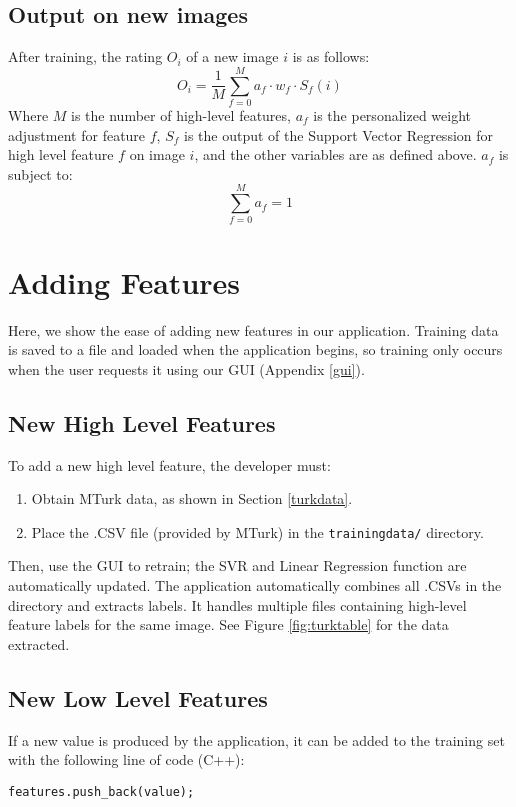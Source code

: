 \documentclass[11pt,letter]{article}
\begin{document}
\subsection{Output on new images}
After training, the rating $O_i$ of a new image $i$ is as follows:
\[
O_i=\frac{1}{M}\displaystyle\sum\limits_{f=0}^Ma_f \cdot w_f \cdot S_f(i)
\]
Where $M$ is the number of high-level features, $a_f$ is the personalized weight adjustment for feature $f$, $S_f$ is the output of the Support Vector Regression for high level feature $f$ on image $i$, and the other variables are as defined above. $a_f$ is subject to:
\[
\displaystyle\sum\limits_{f=0}^M a_f = 1
\]


\section{Adding Features}
Here, we show the ease of adding new features in our application. Training data is saved to a file and loaded when the application begins, so training only occurs when the user requests it using our GUI (Appendix \ref{gui}).

\subsection{New High Level Features}
To add a new high level feature, the developer must:

\begin{enumerate}
\item Obtain MTurk data, as shown in Section \ref{turkdata}.
\item Place the .CSV file (provided by MTurk) in the \texttt{trainingdata/} directory.
\end{enumerate}

Then, use the GUI to retrain; the SVR and Linear Regression function are automatically updated. The application automatically combines all .CSVs in the directory and extracts labels. It handles multiple files containing high-level feature labels for the same image. See Figure \ref{fig:turktable} for the data extracted.

\subsection{New Low Level Features}
If a new value is produced by the application, it can be added to the training set with the following line of code (C++):

\texttt{features.push\_back(value);}
\end{document}

